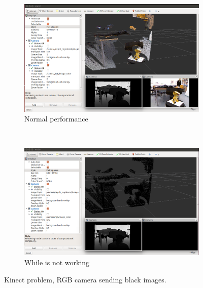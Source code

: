 \documentclass[12pt,a4paper,final,twoside,openright]{report}
\begin{document}
\begin{figure}[h]
\begin{center}
\begin{subfigure}[r]{0.65\textwidth}
		\includegraphics[width=\textwidth]{images/kinect_problem_color}
        \caption{Normal performance}
\end{subfigure}
\\
\begin{subfigure}[r]{0.65\textwidth}
		\includegraphics[width=\textwidth]{images/kinect_problem_black}
        \caption{While is not working}
\end{subfigure}
\caption{Kinect problem, RGB camera sending black images.\label{fig:kinect_black_problem}}
\end{center}
\end{figure}
\end{document}
